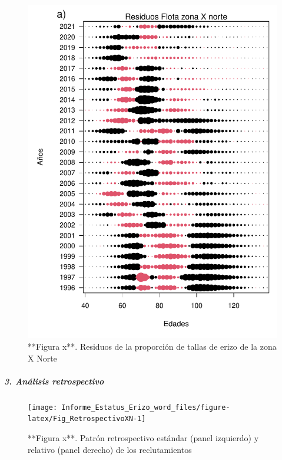 \documentclass[
]{article}
\begin{document}
\begin{figure}

{\centering \includegraphics{Figuras/Fig_residuosCompXN-1} 

}

\caption{**Figura x**. Residuos de la proporción de tallas de erizo de la zona X Norte}\label{fig:Fig_residuosCompXN}
\end{figure}

\hypertarget{anuxe1lisis-retrospectivo-1}{%
\subparagraph{\texorpdfstring{\textbf{\emph{3. Análisis
retrospectivo}}}{3. Análisis retrospectivo}}\label{anuxe1lisis-retrospectivo-1}}

\begin{figure}

{\centering \texttt{[image: Informe\_Estatus\_Erizo\_word\_files/figure-latex/Fig\_RetrospectivoXN-1]} 

}

\caption{**Figura x**.  Patrón retrospectivo estándar (panel izquierdo) y  relativo (panel derecho) de los reclutamientos}\label{fig:Fig_RetrospectivoXN}
\end{figure}
\end{document}
